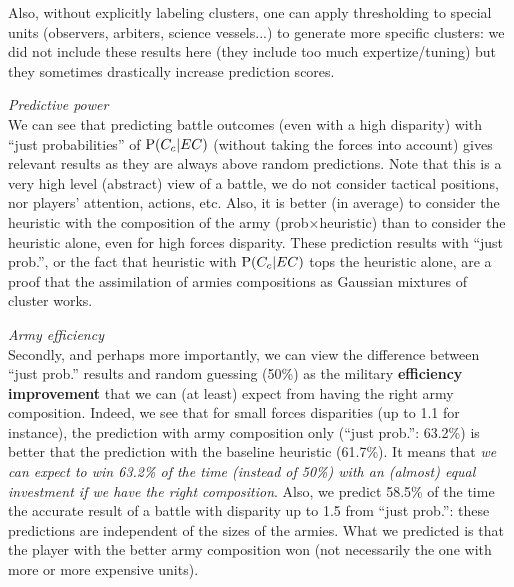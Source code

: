 Also, without explicitly labeling clusters, one can apply thresholding to special units (observers, arbiters, science vessels...) to generate more specific clusters: we did not include these results here (they include too much expertize/tuning) but they sometimes drastically increase prediction scores. %

\vspace{0.2cm}
\textit{Predictive power}\\
We can see that predicting battle outcomes (even with a high disparity) with ``just probabilities'' of $\mathrm{P}(C_c|EC)$ (without taking the forces into account) gives relevant results as they are always above random predictions. Note that this is a very high level (abstract) view of a battle, we do not consider tactical positions, nor players' attention, actions, etc. Also, it is better (in average) to consider the heuristic with the composition of the army (prob$\times$heuristic) than to consider the heuristic alone, even for high forces disparity. These prediction results with ``just prob.'', or the fact that heuristic with $\mathrm{P}(C_c|EC)$ tops the heuristic alone, are a proof that the assimilation of armies compositions as Gaussian mixtures of cluster works.

\vspace{0.2cm}
\textit{Army efficiency}\\
Secondly, and perhaps more importantly, we can view the difference between ``just prob.'' results and random guessing (50\%) as the military \textbf{efficiency improvement} that we can (at least) expect from having the right army composition. 
Indeed, we see that for small forces disparities (up to 1.1 for instance), the prediction with army composition only (``just prob.'': 63.2\%) is better that the prediction with the baseline heuristic (61.7\%). It means that \textit{we can expect to win 63.2\% of the time (instead of 50\%) with an (almost) equal investment if we have the right composition}. %
Also, we predict 58.5\% of the time the accurate result of a battle with disparity up to 1.5 from ``just prob.'': these predictions are independent of the sizes of the armies. What we predicted is that the player with the better army composition won (not necessarily the one with more or more expensive units). 


